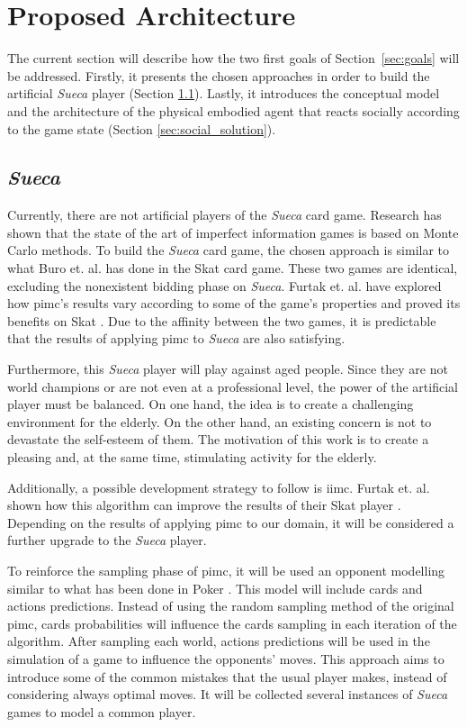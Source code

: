 \section{Proposed Architecture} \label{sec:architecture}

The current section will describe how the two first goals of
Section~\ref{sec:goals} will be addressed.
Firstly, it presents the chosen approaches in order to build the artificial \emph{Sueca} player (Section \ref{sec:sueca_solution}).
Lastly, it introduces the conceptual model and the architecture of the physical embodied agent that reacts socially according to the game state (Section \ref{sec:social_solution}).


\subsection{\emph{Sueca}}
\label{sec:sueca_solution}

Currently, there are not artificial players of the \emph{Sueca} card game.
Research has shown that the state of the art of imperfect information games is based on Monte Carlo methods.
To build the \emph{Sueca} card game, the chosen approach is similar to what Buro et. al. has done in the Skat card game.
These two games are identical, excluding the nonexistent bidding phase on \emph{Sueca}.
Furtak et. al. have explored how \gls{pimc}'s results vary according to some of the game's properties and proved its benefits on Skat \cite{Long2010}.
Due to the affinity between the two games, it is predictable that the results of applying \gls{pimc} to \emph{Sueca} are also satisfying.

Furthermore, this \emph{Sueca} player will play against aged people.
Since they are not world champions or are not even at a professional level, the power of the artificial player must be balanced.
On one hand, the idea is to create a challenging environment for the elderly.
On the other hand, an existing concern is not to devastate the self-esteem of them.
The motivation of this work is to create a pleasing and, at the same time, stimulating activity for the elderly.

Additionally, a possible development strategy to follow is \gls{iimc}.
Furtak et. al. shown how this algorithm can improve the results of their Skat player \cite{Furtak}.
Depending on the results of applying \gls{pimc} to our domain, it will be considered a further upgrade to the \emph{Sueca} player.

To reinforce the sampling phase of \gls{pimc}, it will be used an opponent modelling similar to what has been done in Poker \cite{Ponsen2008}.
This model will include cards and actions predictions.
Instead of using the random sampling method of the original \gls{pimc}, cards probabilities will influence the cards sampling in each iteration of the algorithm.
After sampling each world, actions predictions will be used in the simulation of a game to influence the opponents' moves.
This approach aims to introduce some of the common mistakes that the usual player makes, instead of considering always optimal moves.
It will be collected several instances of \emph{Sueca} games to model a common player.


